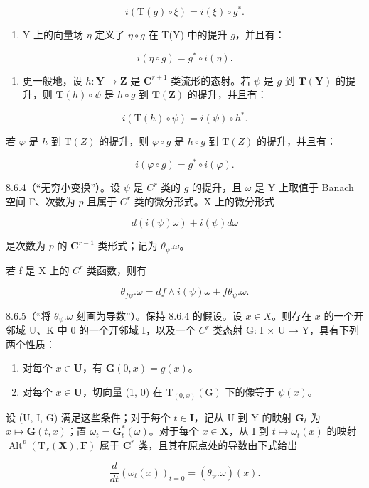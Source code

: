 \[
i (\mathrm{T} (g) \circ \xi) = i (\xi) \circ g ^ {*}.\tag{3}
\]

\begin{enumerate}
\def\labelenumi{\alph{enumi})}
\setcounter{enumi}{1}
\tightlist
\item
  Y 上的向量场 \(\eta\) 定义了 \(\eta \circ g\) 在 T(Y) 中的提升 \(g\)，并且有：
\end{enumerate}

\[
i (\eta \circ g) = g ^ {*} \circ i (\eta).\tag{4}
\]

\begin{enumerate}
\def\labelenumi{\alph{enumi})}
\setcounter{enumi}{2}
\tightlist
\item
  更一般地，设 \(h: \mathbf{Y} \to \mathbf{Z}\) 是 \(\mathbf{C}^{r+1}\) 类流形的态射。若 \(\psi\) 是 \(g\) 到 \(\mathbf{T}(\mathbf{Y})\) 的提升，则 \(\mathbf{T}(h) \circ \psi\) 是 \(h \circ g\) 到 \(\mathbf{T}(\mathbf{Z})\) 的提升，并且有：
\end{enumerate}

\[
i (\mathrm{T} (h) \circ \psi) = i (\psi) \circ h ^ {*}.\tag{5}
\]

若 \(\varphi\) 是 \(h\) 到 \(\mathrm{T}(Z)\) 的提升，则 \(\varphi \circ g\) 是 \(h \circ g\) 到 \(\mathrm{T}(Z)\) 的提升，并且有：

\[
i (\varphi \circ g) = g ^ {*} \circ i (\varphi).\tag{6}
\]

8.6.4（“无穷小变换”）。设 \(\psi\) 是 \(C^r\) 类的 \(g\) 的提升，且 \(\omega\) 是 Y 上取值于 Banach 空间 F、次数为 \(p\) 且属于 \(C^r\) 类的微分形式。X 上的微分形式

\[
d (i (\psi) \omega) + i (\psi) d \omega\tag{7}
\]

是次数为 \(p\) 的 \(\mathbf{C}^{r-1}\) 类形式；记为 \(\theta_{\psi}.\omega\)。

若 f 是 X 上的 \(C^{r}\) 类函数，则有

\[
\theta_ {f \psi}. \omega = d f \wedge i (\psi) \omega + f \theta_ {\psi}. \omega .\tag{8}
\]

8.6.5（“将 \(\theta_{\psi}.\omega\) 刻画为导数”）。保持 8.6.4 的假设。设 \(x\in X\)。则存在 \(x\) 的一个开邻域 U、K 中 0 的一个开邻域 I，以及一个 \(C^{r}\) 类态射 G: I × U → Y，具有下列两个性质：

\begin{enumerate}
\def\labelenumi{\alph{enumi})}
\item
  对每个 \(x \in \mathbf{U}\)，有 \(\mathbf{G}(0, x) = g(x)\)。
\item
  对每个 \(x \in \mathbf{U}\)，切向量 (1, 0) 在 \(\mathrm{T}_{(0,x)}(\mathrm{G})\) 下的像等于 \(\psi(x)\)。
\end{enumerate}

设 (U, I, G) 满足这些条件；对于每个 \(t \in \mathbf{I}\)，记从 U 到 Y 的映射 \(\mathbf{G}_t\) 为 \(x \mapsto \mathbf{G}(t, x)\)；置 \(\omega_t = \mathbf{G}_t^*(\omega)\)。对于每个 \(x \in \mathbf{X}\)，从 I 到 \(t \mapsto \omega_t(x)\) 的映射 \(\operatorname{Alt}^p(\mathrm{T}_x(\mathbf{X}), \mathbf{F})\) 属于 \(\mathbf{C}^r\) 类，且其在原点处的导数由下式给出

\[
\frac {d}{d t} (\omega_ {t} (x)) _ {t = 0} = (\theta_ {\psi}. \omega) (x).\tag{9}
\]

